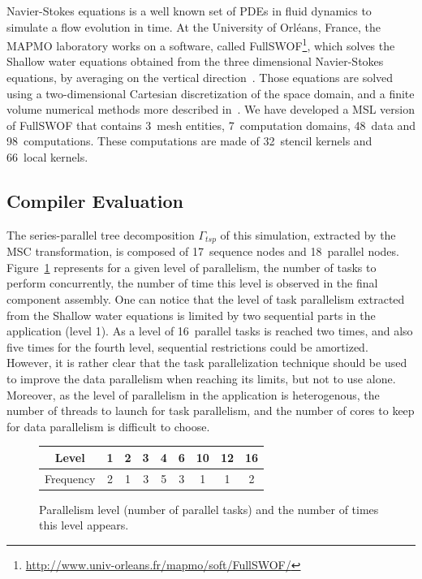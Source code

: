 Navier-Stokes equations is a well known set of PDEs in fluid dynamics to simulate a flow evolution in time. At the University of Orl\'eans, France, the MAPMO laboratory works on a software, called FullSWOF\footnote{\url{http://www.univ-orleans.fr/mapmo/soft/FullSWOF/}}, which solves the Shallow water equations obtained from the three dimensional Navier-Stokes equations, by averaging on the vertical direction~\cite{Ferrari2004}. Those equations are solved using a two-dimensional Cartesian discretization of the space domain, and a finite volume numerical methods more described in~\cite{CPE:CPE3494}. We have developed a MSL version of FullSWOF that contains 3~mesh entities, 7~computation domains, 48~data and 98~computations. These computations are made of 32~stencil kernels and 66~local kernels.

\subsection{Compiler Evaluation}

The series-parallel tree decomposition $\Gamma_{tsp}$ of this simulation, extracted by the MSC transformation, is composed of 17~sequence nodes and 18~parallel nodes. Figure~\ref{fig:freq} represents for a given level of parallelism, \ie the number of tasks to perform concurrently, the number of time this level is observed in the final component assembly. One can notice that the level of task parallelism extracted from the Shallow water equations is limited by two sequential parts in the application (level 1). As a level of 16~parallel tasks is reached two times, and also five times for the fourth level, sequential restrictions could be amortized. However, it is rather clear that the task parallelization technique should be used to improve the data parallelism when reaching its limits, but not to use alone. Moreover, as the level of parallelism in the application is heterogenous, the number of threads to launch for task parallelism, and the number of cores to keep for data parallelism is difficult to choose.

\begin{figure}[!h]
 \begin{center}
 \begin{tabular}{|c|c|c|c|c|c|c|c|c|}
    \hline 
   Level & 1 & 2 & 3 & 4 & 6 & 10 & 12 & 16\\
   \hline
   Frequency & 2 & 1 & 3 & 5 & 3 & 1 & 1 & 2\\
   \hline
 \end{tabular}
\caption{Parallelism level (number of parallel tasks) and the number of times this level appears.}
\label{fig:freq}
 \end{center}
\end{figure}

